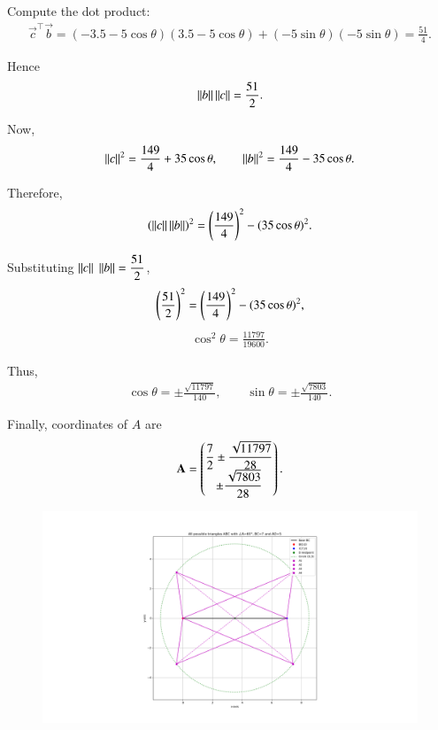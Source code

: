 \documentclass[journal]{IEEEtran}
\begin{document}
Compute the dot product:
\begin{align}
\vec{c}^\top \vec{b}
=(-3.5-5\cos\theta)(3.5-5\cos\theta)+(-5\sin\theta)(-5\sin\theta)
=\frac{51}{4}.
\end{align}

Hence
\begin{align}
\left\lVert b\right\rVert\left\lVert c\right\rVert=\frac{51}{2}.
\end{align}

Now,
\begin{align}
\left\lVert c\right\rVert^2=\dfrac{149}{4}+35\cos\theta,\qquad
\left\lVert b\right\rVert^2=\dfrac{149}{4}-35\cos\theta.
\end{align}

Therefore,
\begin{align}
(\left\lVert c\right\rVert\left\lVert b\right\rVert)^2
=\left(\dfrac{149}{4}\right)^2-(35\cos\theta)^2.
\end{align}

Substituting $\left\lVert c\right\rVert\;\left\lVert b\right\rVert=\dfrac{51}{2}$,
\begin{align}
\left(\dfrac{51}{2}\right)^2=\left(\dfrac{149}{4}\right)^2-(35\cos\theta)^2,
\end{align}
\begin{align}
\cos^2\theta=\frac{11797}{19600}.
\end{align}

Thus,
\begin{align}
\cos\theta=\pm\frac{\sqrt{11797}}{140},\qquad
\sin\theta=\pm\frac{\sqrt{7803}}{140}.
\end{align}

Finally, coordinates of $A$ are
\begin{align}
\mathbf{A}=\begin{pmatrix}
\dfrac{7}{2}\pm\dfrac{\sqrt{11797}}{28}\\ 
\pm\dfrac{\sqrt{7803}}{28}
\end{pmatrix}.
\end{align}

\begin{figure}[H]
    \centering
    \includegraphics[width=1\linewidth]{figs/plot6.png}
    \caption{}
    \label{fig:placeholder}
\end{figure}
\end{document}
